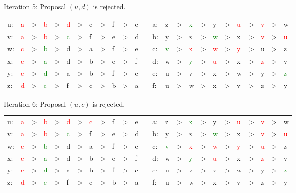 \documentclass{amsart}
\begin{document}
\begin{enumerate}
Iteration 5: Proposal $(u,d)$ is rejected.
\begin{center}
\begin{tabular}{LLLLLLLLLLLLL LLLLLLLLLLLL }
u:&\textcolor{red}{a}&>&\textcolor{red}{b}&>&\textcolor{red}{d}&>&c&>&f&>&e& \quad \quad &a:&z&>&\textcolor{green}{x}&>&y&>&\textcolor{red}{u}&>&\textcolor{red}{v}&>&w\\
v:&\textcolor{red}{a}&>&\textcolor{red}{b}&>&\textcolor{green}{c}&>&f&>&e&>&d& \quad \quad &b:&y&>&z&>&\textcolor{green}{w}&>&x&>&\textcolor{red}{v}&>&\textcolor{red}{u}\\
w:&\textcolor{red}{c}&>&\textcolor{green}{b}&>&d&>&a&>&f&>&e& \quad \quad &c:&\textcolor{green}{v}&>&\textcolor{red}{x}&>&\textcolor{red}{w}&>&\textcolor{red}{y}&>&u&>&z\\
x:&\textcolor{red}{c}&>&\textcolor{green}{a}&>&d&>&b&>&e&>&f& \quad \quad &d:&w&>&\textcolor{green}{y}&>&\textcolor{red}{u}&>&x&>&\textcolor{red}{z}&>&v\\
y:&\textcolor{red}{c}&>&\textcolor{green}{d}&>&a&>&b&>&f&>&e& \quad \quad &e:&u&>&v&>&x&>&w&>&y&>&\textcolor{green}{z}\\
z:&\textcolor{red}{d}&>&\textcolor{green}{e}&>&f&>&c&>&b&>&a& \quad \quad &f:&u&>&w&>&x&>&v&>&z&>&y\\
\end{tabular}
\end{center}
\vspace{.25in}

Iteration 6: Proposal $(u,c)$ is rejected.
\begin{center}
\begin{tabular}{LLLLLLLLLLLLL LLLLLLLLLLLL }
u:&\textcolor{red}{a}&>&\textcolor{red}{b}&>&\textcolor{red}{d}&>&\textcolor{red}{c}&>&f&>&e& \quad \quad &a:&z&>&\textcolor{green}{x}&>&y&>&\textcolor{red}{u}&>&\textcolor{red}{v}&>&w\\
v:&\textcolor{red}{a}&>&\textcolor{red}{b}&>&\textcolor{green}{c}&>&f&>&e&>&d& \quad \quad &b:&y&>&z&>&\textcolor{green}{w}&>&x&>&\textcolor{red}{v}&>&\textcolor{red}{u}\\
w:&\textcolor{red}{c}&>&\textcolor{green}{b}&>&d&>&a&>&f&>&e& \quad \quad &c:&\textcolor{green}{v}&>&\textcolor{red}{x}&>&\textcolor{red}{w}&>&\textcolor{red}{y}&>&\textcolor{red}{u}&>&z\\
x:&\textcolor{red}{c}&>&\textcolor{green}{a}&>&d&>&b&>&e&>&f& \quad \quad &d:&w&>&\textcolor{green}{y}&>&\textcolor{red}{u}&>&x&>&\textcolor{red}{z}&>&v\\
y:&\textcolor{red}{c}&>&\textcolor{green}{d}&>&a&>&b&>&f&>&e& \quad \quad &e:&u&>&v&>&x&>&w&>&y&>&\textcolor{green}{z}\\
z:&\textcolor{red}{d}&>&\textcolor{green}{e}&>&f&>&c&>&b&>&a& \quad \quad &f:&u&>&w&>&x&>&v&>&z&>&y\\
\end{tabular}
\end{center}
\vspace{.25in}



\end{enumerate}
\end{document}
